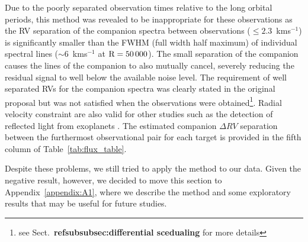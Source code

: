 Due to the poorly separated observation times relative to the long orbital periods, this method was revealed to be inappropriate for these observations as the RV separation of the companion spectra between observations (\(\le 2.3\)~kms\(^{-1}\)) is significantly smaller than the FWHM (full width half maximum) of individual spectral lines (\(\sim\)6~kms\(^{-1}\) at \(\rm R=50\,000\)).  The small separation of the companion causes the lines of the companion to also mutually cancel, severely reducing the residual signal to well below the available noise level. The requirement of well separated RVs for the companion spectra was clearly stated in the original proposal but was not satisfied when the observations were obtained\footnote{see Sect.~\textbf{ref{subsubsec:differential scedualing}} for more details}. Radial velocity constraint are also valid for other studies such as the detection of reflected light from exoplanets \cite{martins_evidence_2015}. The estimated companion \(\Delta RV\) separation between the furthermost observational pair for each target is provided in the fifth column of Table~\ref{tab:flux_table}. 

Despite these problems, we still tried to apply the method to our data. Given the negative result, however, we decided to move this section to Appendix~\ref{appendix:A1}, where we describe the method and some exploratory results that may be useful for future studies.



